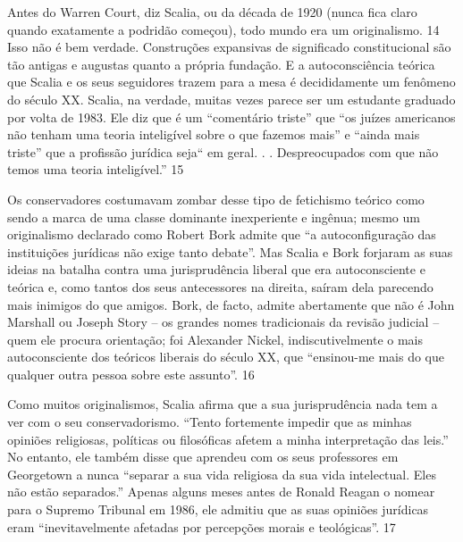 \par
 
Antes do Warren Court, diz Scalia, ou da década de 1920 (nunca fica claro quando exatamente a podridão começou), todo mundo era um originalismo.
 {\color{blue} 14}  
Isso não é bem verdade. Construções expansivas de significado constitucional são tão antigas e augustas quanto a própria fundação. E a autoconsciência teórica que Scalia e os seus seguidores trazem para a mesa é decididamente um fenômeno do século XX. Scalia, na verdade, muitas vezes parece ser um estudante graduado por volta de 1983. Ele diz que é um “comentário triste” que “os juízes americanos não tenham uma teoria inteligível sobre o que fazemos mais” e “ainda mais triste” que a profissão jurídica seja“ em geral. . . Despreocupados com que não temos uma teoria inteligível.”
 {\color{blue} 15}  

 
\par
 
Os conservadores costumavam zombar desse tipo de fetichismo teórico como sendo a marca de uma classe dominante inexperiente e ingênua; mesmo um originalismo declarado como Robert Bork admite que “a autoconfiguração das instituições jurídicas não exige tanto debate”. Mas Scalia e Bork forjaram as suas ideias na batalha contra uma jurisprudência liberal que era autoconsciente e teórica e, como tantos dos seus antecessores na direita, saíram dela parecendo mais inimigos do que amigos. Bork, de facto, admite abertamente que não é John Marshall ou Joseph Story – os grandes nomes tradicionais da revisão judicial – quem ele procura orientação; foi Alexander Nickel, indiscutivelmente o mais autoconsciente dos teóricos liberais do século XX, que “ensinou-me mais do que qualquer outra pessoa sobre este assunto”.
 {\color{blue} 16}  

 
\par
 
Como muitos originalismos, Scalia afirma que a sua jurisprudência nada tem a ver com o seu conservadorismo. “Tento fortemente impedir que as minhas opiniões religiosas, políticas ou filosóficas afetem a minha interpretação das leis.” No entanto, ele também disse que aprendeu com os seus professores em Georgetown a nunca “separar a sua vida religiosa da sua vida intelectual. Eles não estão separados.” Apenas alguns meses antes de Ronald Reagan o nomear para o Supremo Tribunal em 1986, ele admitiu que as suas opiniões jurídicas eram “inevitavelmente afetadas por percepções morais e teológicas”.
 {\color{blue} 17}  

